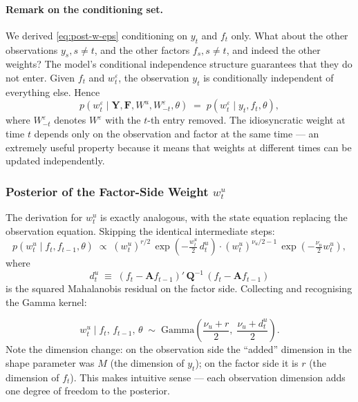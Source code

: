 \documentclass[11pt, a4paper, oneside]{article}
\newcommand{\mY}{\mathbf{Y}}
\newcommand{\mF}{\mathbf{F}}
\newcommand{\mA}{\mathbf{A}}
\newcommand{\mQ}{\mathbf{Q}}
\begin{document}
\paragraph{Remark on the conditioning set.}
We derived \eqref{eq:post-w-eps} conditioning on $y_t$ and $f_t$ only.
What about the other observations $y_s, s \neq t$, and the other
factors $f_s, s \neq t$, and indeed the other weights? The model's
conditional independence structure guarantees that they do not enter.
Given $f_t$ and $w^\varepsilon_t$, the observation $y_t$ is
conditionally independent of everything else. Hence
\[
p(w^\varepsilon_t \mid \mY, \mF, W^u, W^\varepsilon_{-t}, \theta)
\;=\; p(w^\varepsilon_t \mid y_t, f_t, \theta),
\]
where $W^\varepsilon_{-t}$ denotes $W^\varepsilon$ with the $t$-th
entry removed. The idiosyncratic weight at time $t$ depends only on
the observation and factor at the same time — an extremely useful
property because it means that weights at different times can be
updated independently.

\subsubsection{Posterior of the Factor-Side Weight $w^u_t$}

The derivation for $w^u_t$ is exactly analogous, with the state
equation replacing the observation equation. Skipping the identical
intermediate steps:
\[
p(w^u_t \mid f_t, f_{t-1}, \theta) \;\propto\;
(w^u_t)^{r/2}\, \exp\!\left(-\tfrac{w^u_t}{2}\, d^u_t\right)
\cdot
(w^u_t)^{\nu_u/2 - 1}\, \exp\!\left(-\tfrac{\nu_u}{2} w^u_t\right),
\]
where
\begin{equation}
d^u_t \;\equiv\; (f_t - \mA f_{t-1})'\, \mQ^{-1}\, (f_t - \mA f_{t-1})
\label{eq:d-u}
\end{equation}
is the squared Mahalanobis residual on the factor side. Collecting and
recognising the Gamma kernel:

\begin{equation}
\boxed{\;\;
w^u_t \;\big|\; f_t,\, f_{t-1},\, \theta \;\sim\;
\mathrm{Gamma}\!\left(\frac{\nu_u + r}{2},\;
                       \frac{\nu_u + d^u_t}{2}\right).
\;\;}
\label{eq:post-w-u}
\end{equation}
Note the dimension change: on the observation side the ``added''
dimension in the shape parameter was $M$ (the dimension of $y_t$); on
the factor side it is $r$ (the dimension of $f_t$). This makes
intuitive sense — each observation dimension adds one degree of freedom
to the posterior.
\end{document}
